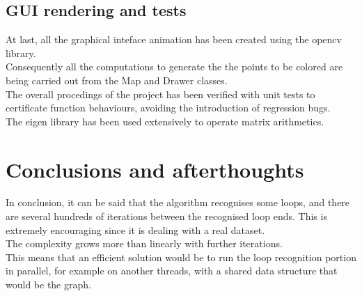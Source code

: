 \subsection{ GUI rendering and tests}
At last, all the graphical inteface animation has been created
using the opencv library.\\Consequently all the computations to generate the
the points to be colored are being carried out from the Map and Drawer classes.\\
The overall procedings of the project has been verified with unit tests
to certificate function behaviours, avoiding the introduction of regression
bugs.\\The eigen library has been used extensively to operate matrix arithmetics.

\section{ Conclusions and afterthoughts}
In conclusion, it can be said that the algorithm recognises some loops, and 
there are several hundreds of iterations between the recognised loop ends.
This is extremely encouraging since it is dealing with a real dataset.\\
The complexity grows more than linearly with further iterations.\\ This means
that an efficient solution would be to run the loop recognition portion in
parallel, for example on another threads, with a shared data structure that
would be the graph.







